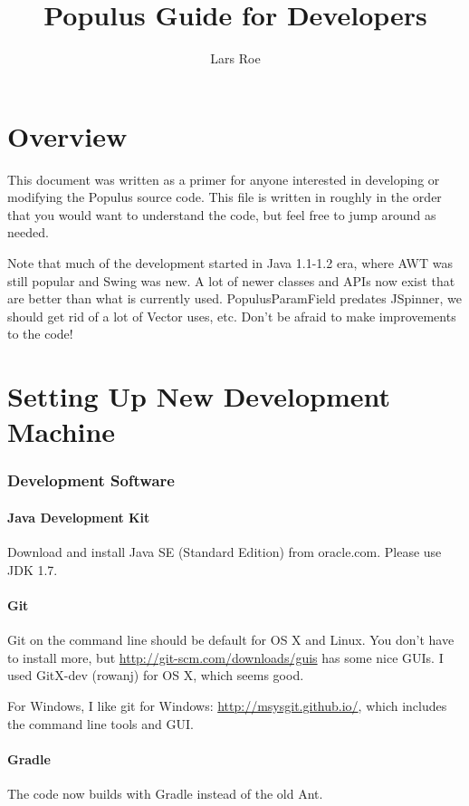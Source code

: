 \documentclass[12pt]{article}
\title{Populus Guide for Developers}
\author{Lars Roe}
\begin{document}
\maketitle
\newpage

\tableofcontents
\newpage

\part{Overview}
This document was written as a primer for anyone interested in developing or modifying the Populus source code.  This file is written in roughly in the order that you would want to understand the code, but feel free to jump around as needed.

Note that much of the development started in Java 1.1-1.2 era, where AWT was still popular and Swing was new.  A lot of newer classes and APIs now exist that are better than what is currently used.  PopulusParamField predates JSpinner, we should get rid of a lot of Vector uses, etc.  Don't be afraid to make improvements to the code!


\part{Setting Up New Development Machine}
\section{Development Software}
\subsection{Java Development Kit}
Download and install Java SE (Standard Edition) from oracle.com.  Please use JDK 1.7.

\subsection{Git}
Git on the command line should be default for OS X and Linux.  You don't have to install more, but \url{http://git-scm.com/downloads/guis} has some nice GUIs.  I used GitX-dev (rowanj) for OS X, which seems good.

For Windows, I like git for Windows:  \url{http://msysgit.github.io/}, which includes the command line tools and GUI.

\subsection{Gradle}
The code now builds with Gradle instead of the old Ant.
\end{document}
